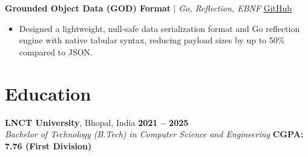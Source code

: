 \documentclass[10pt,a4paper]{article}
\begin{document}
\vspace{2pt}
\textbf{Grounded Object Data (GOD) Format} $\vert$ \textit{Go, Reflection, EBNF} \hfill \href{https://github.com/vinayakgupta29/GOD}{\underline{GitHub}}
\begin{itemize}
  \item Designed a lightweight, null-safe data serialization format and Go reflection engine with native tabular syntax, reducing payload sizes by up to 50\% compared to JSON.
\end{itemize}

\section*{Education}
\textbf{LNCT University}, Bhopal, India \hfill \textbf{2021 – 2025} \\
\textit{Bachelor of Technology (B.Tech) in Computer Science and Engineering} \hfill \textbf{CGPA: 7.76 (First Division)}
\end{document}
